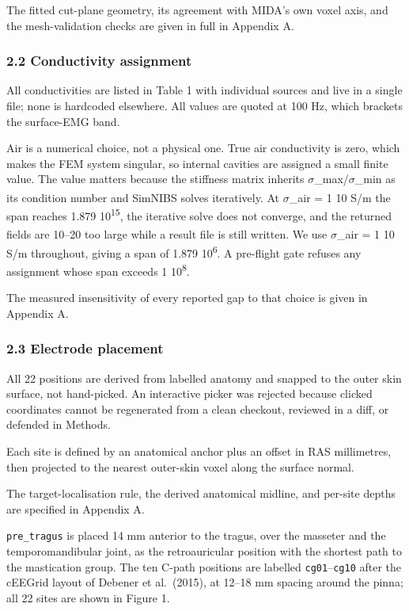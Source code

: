 \documentclass[manuscript,review,anonymous]{acmart}
\newcounter{none}
\begin{document}
The fitted cut-plane geometry, its agreement with MIDA's own voxel axis, and the mesh-validation checks are given in full in Appendix A.

\subsubsection{2.2 Conductivity assignment}\label{conductivity-assignment}

All conductivities are listed in Table 1 with individual sources and live in a
single file; none is hardcoded elsewhere. All values are quoted at 100 Hz, which
brackets the surface-EMG band.

Air is a numerical choice, not a physical one. True air conductivity is
zero, which makes the FEM system singular, so internal cavities are assigned a
small finite value. The value matters because the stiffness matrix inherits
$\sigma$\_max/$\sigma$\_min as its condition number and SimNIBS solves iteratively. At
$\sigma$\_air = 1 \texttimes{} 10\textsuperscript{} S/m the span reaches 1.879 \texttimes{} 10\textsuperscript{15}, the iterative solve does
not converge, and the returned fields are 10--20\texttimes{} too large while a result file
is still written. We use $\sigma$\_air = 1 \texttimes{} 10\textsuperscript{} S/m throughout, giving a span of
1.879 \texttimes{} 10\textsuperscript{6}. A pre-flight gate refuses any assignment whose span exceeds
1 \texttimes{} 10\textsuperscript{8}.

The measured insensitivity of every reported gap to that choice is given in Appendix A.

\subsubsection{2.3 Electrode placement}\label{electrode-placement}

All 22 positions are derived from labelled anatomy and snapped to the outer skin
surface, not hand-picked. An interactive picker was rejected because clicked
coordinates cannot be regenerated from a clean checkout, reviewed in a diff, or
defended in Methods.

Each site is defined by an anatomical anchor plus an offset in RAS millimetres,
then projected to the nearest outer-skin voxel along the surface normal.

The target-localisation rule, the derived anatomical midline, and per-site depths are specified in Appendix A.

\texttt{pre\_tragus} is placed 14 mm anterior to the tragus, over the masseter and the
temporomandibular joint, as the retroauricular position with the shortest path
to the mastication group. The ten C-path positions are labelled \texttt{cg01}--\texttt{cg10}
after the cEEGrid layout of Debener et al.~(2015), at 12--18 mm spacing around
the pinna; all 22 sites are shown in Figure 1.
\end{document}
